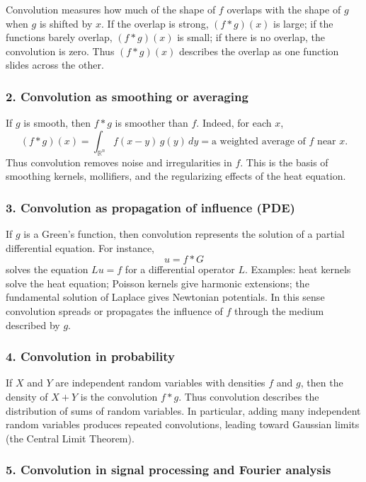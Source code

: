 \documentclass[12pt,a4paper]{article}
\theoremstyle{plain}
\theoremstyle{definition}
\theoremstyle{remark}
\theoremstyle{remark}
\begin{document}
Convolution measures how much of the shape of $f$ overlaps with the shape
of $g$ when $g$ is shifted by $x$. If the overlap is strong, $(f*g)(x)$ is
large; if the functions barely overlap, $(f*g)(x)$ is small; if there is
no overlap, the convolution is zero. Thus $(f*g)(x)$ describes the overlap
as one function slides across the other.

\subsubsection*{2. Convolution as smoothing or averaging}

If $g$ is smooth, then $f*g$ is smoother than $f$. Indeed, for each $x$,
\[
(f*g)(x)
= \int_{\mathbb{R}^n} f(x-y)\,g(y)\,dy
= \text{a weighted average of $f$ near $x$}.
\]
Thus convolution removes noise and irregularities in $f$. This is the basis
of smoothing kernels, mollifiers, and the regularizing effects of the heat
equation.

\subsubsection*{3. Convolution as propagation of influence (PDE)}

If $g$ is a Green's function, then convolution represents the solution of
a partial differential equation. For instance,
\[
u = f * G
\]
solves the equation $Lu = f$ for a differential operator $L$. Examples:
heat kernels solve the heat equation; Poisson kernels give harmonic
extensions; the fundamental solution of Laplace gives Newtonian potentials.
In this sense convolution spreads or propagates the influence of $f$ through
the medium described by $g$.

\subsubsection*{4. Convolution in probability}

If $X$ and $Y$ are independent random variables with densities $f$ and $g$,
then the density of $X+Y$ is the convolution $f*g$. Thus convolution describes
the distribution of sums of random variables. In particular, adding many
independent random variables produces repeated convolutions, leading toward
Gaussian limits (the Central Limit Theorem).

\subsubsection*{5. Convolution in signal processing and Fourier analysis}
\end{document}
